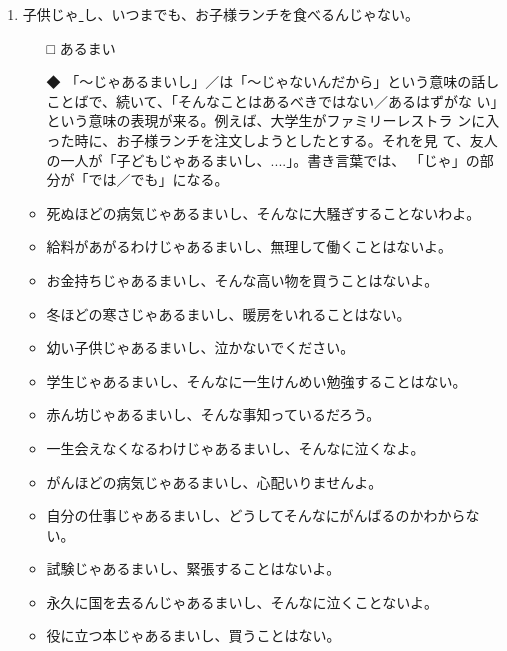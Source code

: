 \documentclass[
uplatex,
b5paper,
10pt,
dvipdfmx
]{jsbook}
\begin{document}
\begin{enumerate}
\item 子供じゃ\underline{   }し、いつまでも、お子様ランチを食べるんじゃない。
\begin{itemize}
\item[□] あるまい
\item[◆] 「〜じゃあるまいし」／は「〜じゃないんだから」という意味の話し
	  ことばで、続いて、「そんなことはあるべきではない／あるはずがな
	  い」という意味の表現が来る。例えば、大学生がファミリーレストラ
	  ンに入った時に、お子様ランチを注文しようとしたとする。それを見
	  て、友人の一人が「子どもじゃあるまいし、....」。書き言葉では、
	  「じゃ」の部分が「では／でも」になる。
\end{itemize}
\begin{itemize}
\item 死ぬほどの病気じゃあるまいし、そんなに大騒ぎすることないわよ。
\item 給料があがるわけじゃあるまいし、無理して働くことはないよ。
\item お金持ちじゃあるまいし、そんな高い物を買うことはないよ。
\item 冬ほどの寒さじゃあるまいし、暖房をいれることはない。
\item 幼い子供じゃあるまいし、泣かないでください。
\item 学生じゃあるまいし、そんなに一生けんめい勉強することはない。
\item 赤ん坊じゃあるまいし、そんな事知っているだろう。
\item 一生会えなくなるわけじゃあるまいし、そんなに泣くなよ。
\item がんほどの病気じゃあるまいし、心配いりませんよ。
\item 自分の仕事じゃあるまいし、どうしてそんなにがんばるのかわからない。
\item 試験じゃあるまいし、緊張することはないよ。
\item 永久に国を去るんじゃあるまいし、そんなに泣くことないよ。
\item 役に立つ本じゃあるまいし、買うことはない。
\end{itemize}


\end{enumerate}
\end{document}
